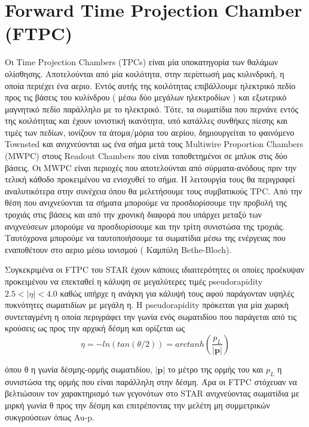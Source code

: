 \section{Forward Time Projection Chamber (FTPC)}

	Οι Time Projection Chambers (TPCs) είναι μία υποκατηγορία των θαλάμων ολίσθησης. 
	Αποτελούνται από μία κοιλότητα, στην περίπτωσή μας κυλινδρική, η οποία περιέχει ένα αεριο. Εντός αυτής της κοιλότητας επιβάλλουμε ηλεκτρικό πεδίο προς τις βάσεις του κυλίνδρου ( μέσω δύο μεγάλων ηλεκτροδίων ) και εξωτερικό μαγνητικό πεδίο παράλληλο με το ηλεκτρικό.
	Τότε, τα σωματίδια που περνάνε εντός της κοιλότητας και έχουν ιονιστική ικανότητα, υπό κατάλλες συνθήκες πίεσης και τιμές των πεδίων, ιονίζουν τα άτομα/μόρια του αερίου, δημιουργείται το φαινόμενο Townsted και ανιχνεύονται ως ένα σήμα μετά τους Multiwire  Proportion Chambers (MWPC)  στους Readout Chambers που είναι τοποθετημένοι σε μπλοκ στις δύο βάσεις. Οι MWPC είναι περιοχές που αποτελούνται από σύρματα-ανόδους πριν την τελική κάθοδο προκειμένου να ενισχυθεί το σήμα. Η λειτουργία τους θα περιγραφεί αναλυτικότερα στην συνέχεια όπου θα μελετήσουμε τους συμβατικούς TPC.
	Από την θέση που ανιχνεύονται τα σήματα μπορούμε να προσδιορίσουμε την προβολή της τροχιάς στις βάσεις και από την χρονική διαφορά που υπάρχει μεταξύ των ανιχνεύσεων μπορούμε να προσδιορίσουμε και την τρίτη συνιστώσα της τροχιάς. Ταυτόχρονα μπορούμε να ταυτοποιήσουμε τα σωματίδια μέσω της ενέργειας που εναποθέτουν στο αεριο μέσω ιονισμού ( Καμπύλη Bethe-Bloch).
	
	
	 Συγκεκριμένα οι FTPC του STAR έχουν κάποιες ιδιαιτερότητες οι οποίες προέκυψαν προκειμένου να επεκταθεί η κάλυψη σε μεγαλύτερες τιμές pseudorapidity $2.5<|\eta|<4.0$ καθώς υπήρχε η ανάγκη για κάλυψή τους αφού παράγονταν υψηλές πυκνότητες σωματιδίων με μεγάλη η. Η pseudorapidity πρόκειται για μία χωρική συντεταγμένη η οποία περιγράφει την γωνία ενός σωματιδίου που παράγεται από τις κρούσεις ως προς την αρχική δέσμη και ορίζεται ως 
	 	\begin{equation}\label{eq3.1}
	 		\eta = -ln\left(tan(\theta/2)\right) = arctanh(\frac{p_L}{|\bm{p}|} )
	 	\end{equation}
	 	
	 	όπου θ η γωνία δέσμης-ορμής σωματιδίου, $|\bm{p}|$ το μέτρο της ορμής του και $p_L$ η συνιστώσα της ορμής που είναι παράλληλη στην δέσμη. Άρα οι FTPC στόχευαν  να βελτιώσουν τον χαρακτηρισμό των γεγονότων στο STAR ανιχνεύοντας σωματίδια με μιρκή γωνία θ προς την δέσμη και επιτρέποντας την μελέτη μη συμμετρικών συκγρούσεων όπως Au-p. 
	 	

